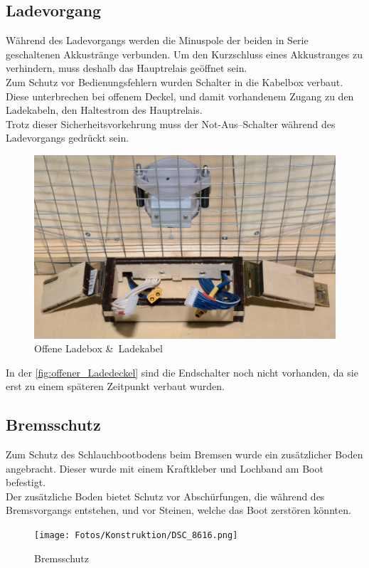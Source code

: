 \subsection{Ladevorgang}
Während des Ladevorgangs werden die Minuspole der beiden in Serie geschaltenen Akkustränge verbunden. Um den Kurzschluss eines Akkustranges zu verhindern, muss deshalb das Hauptrelais geöffnet sein.\\
Zum Schutz vor Bedienungsfehlern wurden Schalter in die Kabelbox verbaut. Diese unterbrechen bei offenem Deckel, und damit vorhandenem Zugang zu den Ladekabeln, den Haltestrom des Hauptrelais.\\
Trotz dieser Sicherheitsvorkehrung muss der Not-Aus--Schalter während des Ladevorgangs gedrückt sein.
\begin{figure}[H]
    \centering
    \includegraphics[width=\textwidth]{Fotos/Ladedeckel_DSC_8794.png}
    \caption{Offene Ladebox \&\ Ladekabel \label{fig:offener_Ladedeckel}}    
\end{figure}

In der \autoref{fig:offener_Ladedeckel} sind die Endschalter noch nicht vorhanden, da sie erst zu einem späteren Zeitpunkt verbaut wurden. 

\clearpage
\subsection{Bremsschutz}
Zum Schutz des Schlauchbootbodens beim Bremsen wurde ein zusätzlicher Boden angebracht. Dieser wurde mit einem Kraftkleber und Lochband am Boot befestigt.\\
Der zusätzliche Boden bietet Schutz vor Abschürfungen, die während des Bremsvorgangs entstehen, und vor Steinen, welche das Boot zerstören könnten.
\begin{figure}[H]
    \centering
    \texttt{[image: Fotos/Konstruktion/DSC\_8616.png]}
    \caption{Bremsschutz}    
\end{figure}

